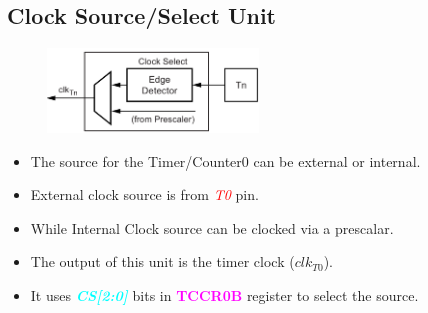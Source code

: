 \documentclass{article}
\newcommand{\bitFormat}[1]{\emph{\textbf{\textcolor{cyan}{#1}}}}
\newcommand{\regFormat}[1]{\textbf{\textcolor{magenta}{#1}}}
\newcommand{\pinFormat}[1]{\emph{\textcolor{red}{#1}}}
\begin{document}
\subsection{Clock Source/Select Unit}
\begin{figure}[H]
    \begin{center}
        \includegraphics[width=0.5\textwidth]{Timer0ClockSelector.png}
    \end{center}
\end{figure}
\begin{itemize}
    \item The source for the Timer/Counter0 can be external or internal.
    \item External clock source is from \pinFormat{T0} pin.
    \item While Internal Clock source can be clocked via a prescalar.
    \item The output of this unit is the timer clock ($clk_{T0}$).
    \item It uses \bitFormat{CS[2:0]} bits in \regFormat{TCCR0B} register to select the source.
\end{itemize}
\end{document}
